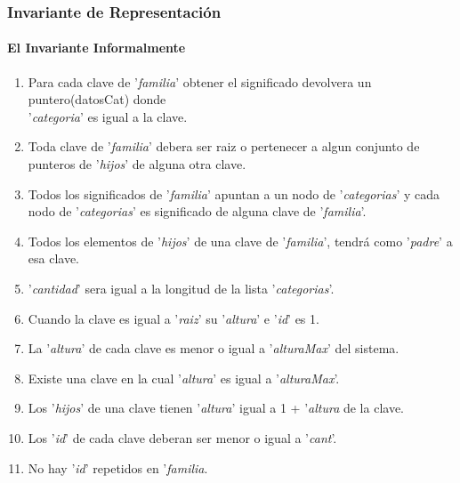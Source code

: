 \subsubsection{Invariante de Representaci\'on}
\paragraph{El Invariante Informalmente}
\begin{enumerate}
\item Para cada clave de '\textit{familia}' obtener el significado devolvera un puntero(datosCat) donde\\ '\textit{categoria}' es igual a la clave.
\item Toda clave de '\textit{familia}' debera ser raiz o pertenecer a algun conjunto de punteros de '\textit{hijos}' de alguna otra clave.
\item Todos los significados de '\textit{familia}' apuntan a un nodo de '\textit{categorias}' y cada nodo de '\textit{categorias}' es significado de alguna clave de '\textit{familia}'.
\item Todos los elementos de '\textit{hijos}' de una clave de '\textit{familia}', tendrá como '\textit{padre}' a esa clave.
\item '\textit{cantidad}' sera igual a la longitud de la lista '\textit{categorias}'.
\item Cuando la clave es igual a '\textit{raiz}' su '\textit{altura}' e '\textit{id}' es 1.
\item La '\textit{altura}' de cada clave es menor o igual a '\textit{alturaMax}' del sistema.
\item Existe una clave en la cual '\textit{altura}' es igual a '\textit{alturaMax}'.
\item Los '\textit{hijos}' de una clave tienen '\textit{altura}' igual a 1 + '\textit{altura} de la clave.
\item Los '\textit{id}' de cada clave deberan ser menor o igual a '\textit{cant}'.
\item No hay '\textit{id}' repetidos en '\textit{familia}.

\end{enumerate}

